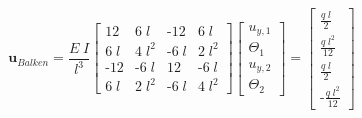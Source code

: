 \begin{equation}
    [K_{\text{Balken}}] \boldsymbol{u}_{Balken} = \frac{E \; I}{l^3} 
    \begin{bmatrix}
        12 & 6 \; l & \text{-}12 & 6 \; l        \\
        6 \; l & 4 \; l^2 & \text{-}6 \; l & 2 \; l^2 \\
        \text{-}12 & \text{-}6 \; l & 12 & \text{-}6 \; l      \\
        6 \; l & 2 \; l^2 & \text{-}6 \; l & 4 \; l^2
    \end{bmatrix}
    \begin{bmatrix}
        u_{y,1}  \\
        \Theta_1 \\
        u_{y,2}  \\
        \Theta_2
    \end{bmatrix}
    = 
    \begin{bmatrix}
        \frac{q \; l}{2}  \\
        \frac{q \; l^2}{12} \\
        \frac{q \; l}{2}  \\
        \text{-}\frac{q \; l^2}{12}
    \end{bmatrix} 
\end{equation}


